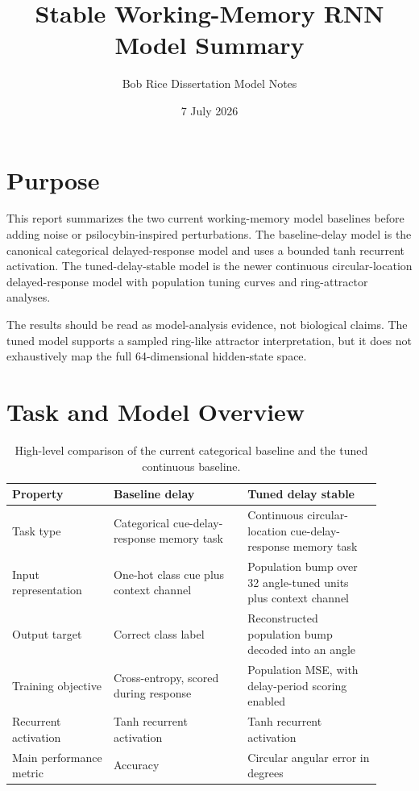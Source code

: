 \documentclass[11pt,a4paper]{article}
\title{Stable Working-Memory RNN Model Summary}
\author{Bob Rice Dissertation Model Notes}
\date{7 July 2026}
\begin{document}
\maketitle

\section*{Purpose}

This report summarizes the two current working-memory model baselines before adding noise or psilocybin-inspired perturbations. The baseline-delay model is the canonical categorical delayed-response model and uses a bounded tanh recurrent activation. The tuned-delay-stable model is the newer continuous circular-location delayed-response model with population tuning curves and ring-attractor analyses.

The results should be read as model-analysis evidence, not biological claims. The tuned model supports a sampled ring-like attractor interpretation, but it does not exhaustively map the full 64-dimensional hidden-state space.

\section{Task and Model Overview}

\begin{table}[H]
\centering
\small
\begin{tabular}{p{0.25\linewidth}p{0.33\linewidth}p{0.33\linewidth}}
\toprule
Property & Baseline delay & Tuned delay stable \\
\midrule
Task type & Categorical cue-delay-response memory task & Continuous circular-location cue-delay-response memory task \\
Input representation & One-hot class cue plus context channel & Population bump over 32 angle-tuned units plus context channel \\
Output target & Correct class label & Reconstructed population bump decoded into an angle \\
Training objective & Cross-entropy, scored during response & Population MSE, with delay-period scoring enabled \\
Recurrent activation & Tanh recurrent activation & Tanh recurrent activation \\
Main performance metric & Accuracy & Circular angular error in degrees \\
\bottomrule
\end{tabular}
\caption{High-level comparison of the current categorical baseline and the tuned continuous baseline.}
\end{table}
\end{document}
